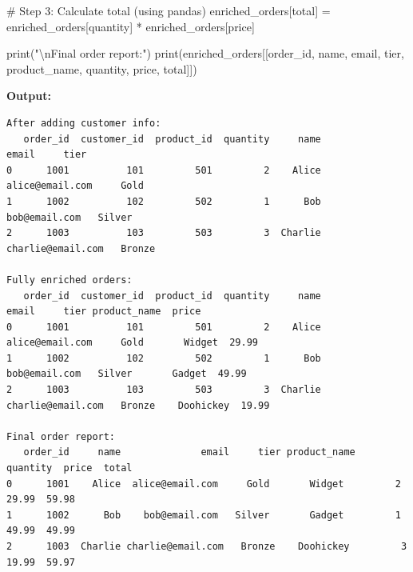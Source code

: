 \documentclass[
  letterpaper,
]{scrbook}
\newenvironment{Shaded}{\begin{snugshade}}{\end{snugshade}}
\newcommand{\BuiltInTok}[1]{\textcolor[rgb]{0.00,0.23,0.31}{#1}}
\newcommand{\CharTok}[1]{\textcolor[rgb]{0.13,0.47,0.30}{#1}}
\newcommand{\CommentTok}[1]{\textcolor[rgb]{0.37,0.37,0.37}{#1}}
\newcommand{\NormalTok}[1]{\textcolor[rgb]{0.00,0.23,0.31}{#1}}
\newcommand{\OperatorTok}[1]{\textcolor[rgb]{0.37,0.37,0.37}{#1}}
\newcommand{\StringTok}[1]{\textcolor[rgb]{0.13,0.47,0.30}{#1}}
\begin{document}
\begin{Shaded}
\begin{Highlighting}[]
\CommentTok{\# Step 3: Calculate total (using pandas)}
\NormalTok{enriched\_orders[}\StringTok{\textquotesingle{}total\textquotesingle{}}\NormalTok{] }\OperatorTok{=}\NormalTok{ enriched\_orders[}\StringTok{\textquotesingle{}quantity\textquotesingle{}}\NormalTok{] }\OperatorTok{*}\NormalTok{ enriched\_orders[}\StringTok{\textquotesingle{}price\textquotesingle{}}\NormalTok{]}

\BuiltInTok{print}\NormalTok{(}\StringTok{"}\CharTok{\textbackslash{}n}\StringTok{Final order report:"}\NormalTok{)}
\BuiltInTok{print}\NormalTok{(enriched\_orders[[}\StringTok{\textquotesingle{}order\_id\textquotesingle{}}\NormalTok{, }\StringTok{\textquotesingle{}name\textquotesingle{}}\NormalTok{, }\StringTok{\textquotesingle{}email\textquotesingle{}}\NormalTok{, }\StringTok{\textquotesingle{}tier\textquotesingle{}}\NormalTok{, }
                        \StringTok{\textquotesingle{}product\_name\textquotesingle{}}\NormalTok{, }\StringTok{\textquotesingle{}quantity\textquotesingle{}}\NormalTok{, }\StringTok{\textquotesingle{}price\textquotesingle{}}\NormalTok{, }\StringTok{\textquotesingle{}total\textquotesingle{}}\NormalTok{]])}
\end{Highlighting}
\end{Shaded}

\textbf{Output:}

\begin{verbatim}
After adding customer info:
   order_id  customer_id  product_id  quantity     name              email     tier
0      1001          101         501         2    Alice  alice@email.com     Gold
1      1002          102         502         1      Bob    bob@email.com   Silver
2      1003          103         503         3  Charlie charlie@email.com   Bronze

Fully enriched orders:
   order_id  customer_id  product_id  quantity     name              email     tier product_name  price
0      1001          101         501         2    Alice  alice@email.com     Gold       Widget  29.99
1      1002          102         502         1      Bob    bob@email.com   Silver       Gadget  49.99
2      1003          103         503         3  Charlie charlie@email.com   Bronze    Doohickey  19.99

Final order report:
   order_id     name              email     tier product_name  quantity  price  total
0      1001    Alice  alice@email.com     Gold       Widget         2  29.99  59.98
1      1002      Bob    bob@email.com   Silver       Gadget         1  49.99  49.99
2      1003  Charlie charlie@email.com   Bronze    Doohickey         3  19.99  59.97
\end{verbatim}
\end{document}

